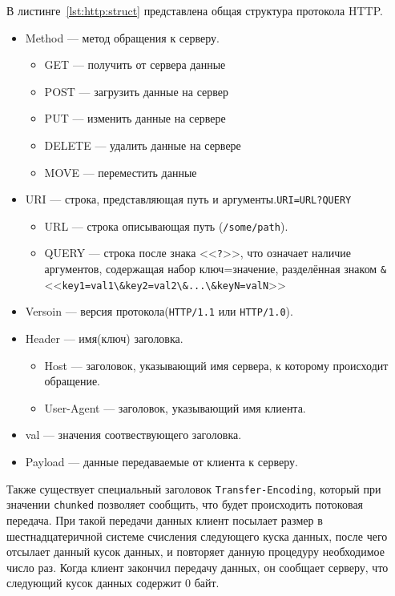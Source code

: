 В листинге~\ref{lst:http:struct} представлена общая структура протокола HTTP.
\begin{itemize}
    \item Method --- метод обращения к серверу.
    \begin{itemize}
        \item GET --- получить от сервера данные
        \item POST --- загрузить данные на сервер
        \item PUT --- изменить данные на сервере
        \item DELETE --- удалить данные на сервере
        \item MOVE --- переместить данные
    \end{itemize}
    \item URI --- строка, представляющая путь и аргументы.{\tt URI=URL?QUERY}
    \begin{itemize}
        \item URL --- строка описывающая путь (\texttt{/some/path}).
        \item QUERY --- строка после знака <<\verb!?!>>, что означает наличие аргументов,
            содержащая набор ключ=значение, разделённая знаком \texttt{\&} \\
            <<\verb!key1=val1\&key2=val2\&...\&keyN=valN!>>
    \end{itemize}
    \item Versoin --- версия протокола(\texttt{HTTP/1.1} или \texttt{HTTP/1.0}).
    \item Header --- имя(ключ) заголовка.
    \begin{itemize}
        \item Host --- заголовок, указывающий имя сервера, к которому происходит обращение.
        \item User-Agent --- заголовок, указывающий имя клиента.
    \end{itemize}
    \item val --- значения соотвествующего заголовка.
    \item Payload --- данные передаваемые от клиента к серверу.
\end{itemize}

Также существует специальный заголовок \texttt{Transfer-Encoding}, который при
значении \texttt{chunked} позволяет сообщить, что будет происходить потоковая передача.
При такой передачи данных клиент посылает размер в шестнадцатеричной системе
счисления следующего куска данных, после чего отсылает данный кусок данных, и
повторяет данную процедуру необходимое число раз. \mbox{Когда} клиент закончил передачу данных,
он сообщает серверу, что следующий кусок данных содержит 0 байт.

